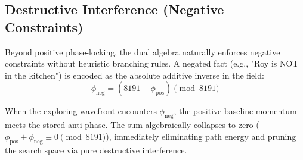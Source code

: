 \subsection{Destructive Interference (Negative Constraints)}
\label{sec:negative_constraints}

Beyond positive phase-locking, the dual algebra naturally enforces negative constraints without heuristic branching rules. A negated fact (e.g., "Roy is NOT in the kitchen") is encoded as the absolute additive inverse in the field:
\begin{equation}
  \phi_{\text{neg}} = (8191 - \phi_{\text{pos}}) \pmod{8191}
  \label{eq:additive_inverse}
\end{equation}

When the exploring wavefront encounters $\phi_{\text{neg}}$, the positive baseline momentum meets the stored anti-phase. The sum algebraically collapses to zero ($\phi_{\text{pos}} + \phi_{\text{neg}} \equiv 0 \pmod{8191}$), immediately eliminating path energy and pruning the search space via pure destructive interference.
